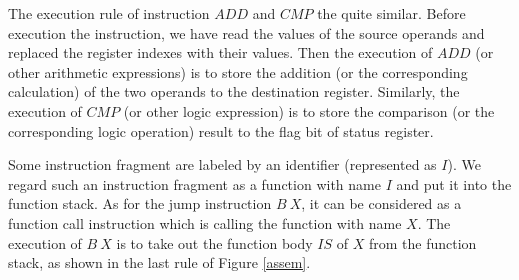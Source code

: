 \documentclass[letterpaper, 10 pt, conference]{IEEEtran}
\begin{document}
\par The execution rule of instruction $ADD$ and $CMP$ the quite similar. Before execution the instruction, we have read the values of the source operands and replaced the register indexes with their values. Then the execution of $ADD$ (or other arithmetic expressions) is to store the addition (or the corresponding calculation) of the two operands to the destination register. Similarly, the execution of $CMP$ (or other logic expression) is to store the comparison (or the corresponding logic operation) result to the flag bit of status register.
\par Some instruction fragment are labeled by an identifier (represented as $I$). We regard such an instruction fragment as a function with name $I$ and put it into the function stack. As for the jump instruction $B~X$, it can be considered as a function call instruction which is calling the function with name $X$. The execution of $B~X$ is to take out the function body $IS$ of $X$ from the function stack, as shown in the last rule of Figure \ref{assem}.
\end{document}
